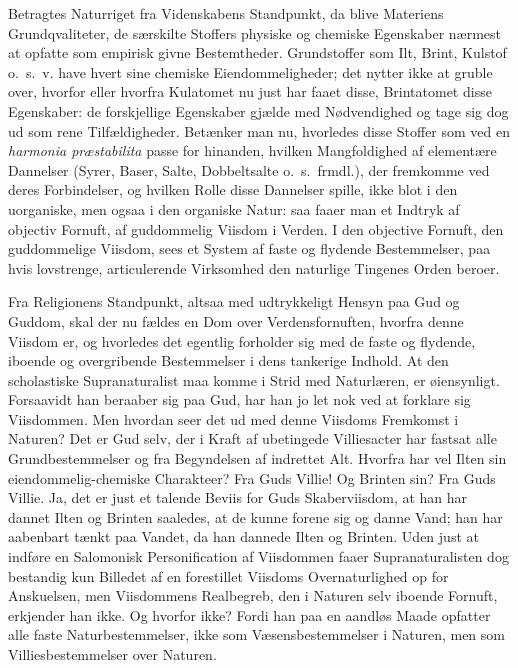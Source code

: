 \documentclass[12pt]{book}
\begin{document}
Betragtes Naturriget fra Videnskabens Standpunkt, da blive Materiens
Grundqvaliteter, de særskilte Stoffers physiske og chemiske
Egenskaber nærmest at opfatte som empirisk givne Bestemtheder.
Grundstoffer som Ilt, Brint, Kulstof o.\ s.\ v. have hvert sine
chemiske Eiendommeligheder; det nytter ikke at gruble over, hvorfor
eller hvorfra Kulatomet nu just har faaet disse, Brintatomet disse
Egenskaber: de forskjellige Egenskaber gjælde med Nødvendighed og
tage sig dog ud som rene Tilfældigheder. Betænker man nu, hvorledes
disse Stoffer som ved en \textit{harmonia præstabilita} passe for
hinanden, hvilken Mangfoldighed af elementære Dannelser (Syrer,
Baser, Salte, Dobbeltsalte o.\ s.\ frmdl.), der fremkomme ved
deres Forbindelser, og hvilken Rolle disse Dannelser spille, ikke
blot i den uorganiske, men ogsaa i den organiske Natur: saa faaer
man et Indtryk af objectiv Fornuft, af guddommelig Viisdom i Verden.
I den objective Fornuft, den guddommelige Viisdom, sees et System af
faste og flydende Bestemmelser, paa hvis lovstrenge, articulerende
Virksomhed den naturlige Tingenes Orden beroer.

Fra Religionens Standpunkt, altsaa med udtrykkeligt Hensyn paa Gud
og Guddom, skal der nu fældes en Dom over Verdensfornuften, hvorfra
denne Viisdom er, og hvorledes det egentlig forholder sig med de
faste og flydende, iboende og overgribende Bestemmelser i dens
tankerige Indhold. At den scholastiske Supranaturalist maa komme i
Strid med Naturlæren, er øiensynligt. Forsaavidt han beraaber sig
paa Gud, har han jo let nok ved at forklare sig Viisdommen. Men
hvordan seer det ud med denne Viisdoms Fremkomst i Naturen? Det er
Gud selv, der i Kraft af ubetingede Villiesacter har fastsat alle
Grundbestemmelser og fra Begyndelsen af indrettet Alt. Hvorfra har
vel Ilten sin eiendommelig-chemiske Charakteer? Fra Guds Villie! Og
Brinten sin? Fra Guds Villie. Ja, det er just et talende Beviis for
Guds Skaberviisdom, at han har dannet Ilten og Brinten saaledes, at
de kunne forene sig og danne Vand; han har aabenbart tænkt paa
Vandet, da han dannede Ilten og Brinten. Uden just at indføre en
Salomonisk Personification af Viisdommen faaer Supranaturalisten dog
bestandig kun Billedet af en forestillet Viisdoms Overnaturlighed op
for Anskuelsen, men Viisdommens Realbegreb, den i Naturen selv
iboende Fornuft, erkjender han ikke. Og hvorfor ikke? Fordi han paa
en aandløs Maade opfatter alle faste Naturbestemmelser, ikke som
Væsensbestemmelser i Naturen, men som Villiesbestemmelser over
Naturen.
\end{document}
